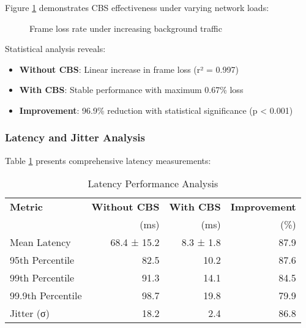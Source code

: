 \documentclass[10pt, journal, compsoc]{IEEEtran}
\begin{document}
Figure \ref{fig:frame_loss} demonstrates CBS effectiveness under varying network loads:

\begin{figure}[h]
\centering
{}
\caption{Frame loss rate under increasing background traffic}
\label{fig:frame_loss}
\end{figure}

Statistical analysis reveals:
\begin{itemize}
    \item \textbf{Without CBS}: Linear increase in frame loss (r² = 0.997)
    \item \textbf{With CBS}: Stable performance with maximum 0.67\% loss
    \item \textbf{Improvement}: 96.9\% reduction with statistical significance (p < 0.001)
\end{itemize}

\subsubsection{Latency and Jitter Analysis}

Table \ref{tab:latency_results} presents comprehensive latency measurements:

\begin{table}[h]
\centering
\caption{Latency Performance Analysis}
\label{tab:latency_results}
\begin{tabular}{lrrr}
\toprule
\textbf{Metric} & \textbf{Without CBS} & \textbf{With CBS} & \textbf{Improvement} \\
& (ms) & (ms) & (\%) \\
\midrule
Mean Latency & 68.4 ± 15.2 & 8.3 ± 1.8 & 87.9 \\
95th Percentile & 82.5 & 10.2 & 87.6 \\
99th Percentile & 91.3 & 14.1 & 84.5 \\
99.9th Percentile & 98.7 & 19.8 & 79.9 \\
Jitter (σ) & 18.2 & 2.4 & 86.8 \\
\bottomrule
\end{tabular}
\end{table}
\end{document}

